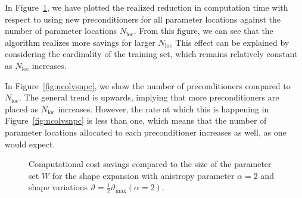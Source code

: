 In Figure~\ref{fig:costvsncol}, we have plotted the realized reduction in computation time with respect to using new preconditioners for all parameter locations against the number of parameter locations $N_{\text{loc}}$.
From this figure, we can see that the algorithm realizes more savings for larger $N_{\text{loc}}$
This effect can be explained by considering the cardinality of the training set, which remains relatively constant as $N_{\text{loc}}$ increases.

In Figure~\ref{fig:ncolvsnpc}, we show the number of preconditioners compared to $N_{\text{loc}}$.
The general trend is upwards, implying that more preconditioners are placed as $N_{\text{loc}}$ increases.
However, the rate at which this is happening in Figure~\ref{fig:ncolvsnpc} is less than one, which means that the number of parameter locations allocated to each preconditioner increases as well, as one would expect.

\begin{figure}
    \centering
    \caption{Computational cost savings compared to the size of the parameter set $W$ for the shape expansion with anistropy parameter $\alpha=2$ and shape variations $\vartheta=\frac{1}{2}\vartheta_{\max}(\alpha=2)$.}
    \label{fig:costvsncol}
\end{figure}

